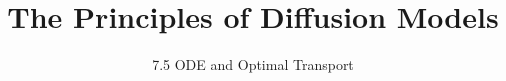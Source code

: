 
\title{The Principles of Diffusion Models}
\subtitle{7.5 ODE and Optimal Transport}


\begin{frame}
    \titlepage
\end{frame}



